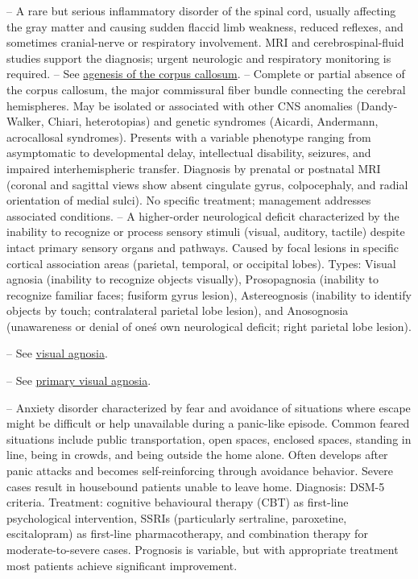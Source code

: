 -- A rare but serious inflammatory disorder of the spinal cord, usually affecting the gray matter and causing sudden flaccid limb weakness, reduced reflexes, and sometimes cranial-nerve or respiratory involvement. MRI and cerebrospinal-fluid studies support the diagnosis; urgent neurologic and respiratory monitoring is required.
-- See \hyperlink{Agenesis of the Corpus Callosum}{agenesis of the corpus callosum}.
-- Complete or partial absence of the corpus callosum, the major commissural fiber bundle connecting the cerebral hemispheres. May be isolated or associated with other CNS anomalies (Dandy-Walker, Chiari, heterotopias) and genetic syndromes (Aicardi, Andermann, acrocallosal syndromes). Presents with a variable phenotype ranging from asymptomatic to developmental delay, intellectual disability, seizures, and impaired interhemispheric transfer. Diagnosis by prenatal or postnatal MRI (coronal and sagittal views show absent cingulate gyrus, colpocephaly, and radial orientation of medial sulci). No specific treatment; management addresses associated conditions.
-- A higher-order neurological deficit characterized by the inability to recognize or process sensory stimuli (visual, auditory, tactile) despite intact primary sensory organs and pathways. Caused by focal lesions in specific cortical association areas (parietal, temporal, or occipital lobes). Types: Visual agnosia (inability to recognize objects visually), Prosopagnosia (inability to recognize familiar faces; fusiform gyrus lesion), Astereognosis (inability to identify objects by touch; contralateral parietal lobe lesion), and Anosognosia (unawareness or denial of one\'s own neurological deficit; right parietal lobe lesion).

-- See \hyperlink{Visual Agnosia}{visual agnosia}.

-- See \hyperlink{Primary Visual Agnosia}{primary visual agnosia}.

-- Anxiety disorder characterized by fear and avoidance of situations where escape might be difficult or help unavailable during a panic-like episode. Common feared situations include public transportation, open spaces, enclosed spaces, standing in line, being in crowds, and being outside the home alone. Often develops after panic attacks and becomes self-reinforcing through avoidance behavior. Severe cases result in housebound patients unable to leave home. Diagnosis: DSM-5 criteria. Treatment: cognitive behavioural therapy (CBT) as first-line psychological intervention, SSRIs (particularly sertraline, paroxetine, escitalopram) as first-line pharmacotherapy, and combination therapy for moderate-to-severe cases. Prognosis is variable, but with appropriate treatment most patients achieve significant improvement.

